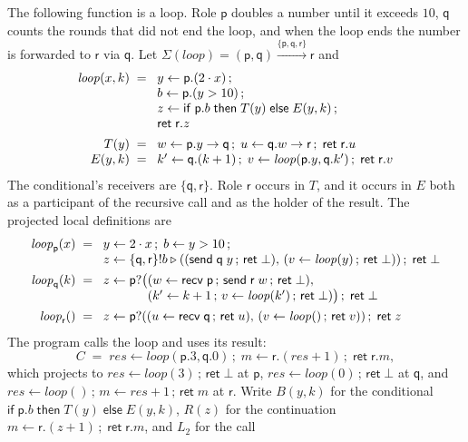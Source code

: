 \documentclass[11pt]{report}
\theoremstyle{plain}
\theoremstyle{definition}
\theoremstyle{remark}
\newcommand{\kw}[1]{\mathsf{#1}}
\newcommand{\pp}{\mathsf{p}}
\newcommand{\qq}{\mathsf{q}}
\newcommand{\rr}{\mathsf{r}}
\newcommand{\bind}[3]{#1 \leftarrow #2\,;\;#3}
\newcommand{\cret}[1]{\kw{ret}\;#1}
\newcommand{\com}[3]{#1.#2 \to #3}
\newcommand{\cif}[4]{\kw{if}\;#1.#2\;\kw{then}\;#3\;\kw{else}\;#4}
\newcommand{\nsend}[2]{\kw{send}\;#1\;#2}
\newcommand{\nrecv}[1]{\kw{recv}\;#1}
\newcommand{\sendbr}[4]{#1!#2 \mathbin{\triangleright} (#3,\,#4)}
\newcommand{\recvbr}[3]{#1?(#2,\,#3)}
\newcommand{\Sig}{\Sigma}
\newcommand{\farr}[3]{(#1) \xrightarrow{#2} #3}
\begin{document}
The following function is a loop.  Role $\pp$ doubles a number until it
exceeds $10$, $\qq$ counts the rounds that did not end the loop, and when the
loop ends the number is forwarded to $\rr$ via $\qq$.  Let
$\Sig(\mathit{loop})=\farr{\pp,\qq}{\{\pp,\qq,\rr\}}{\rr}$ and
\[
\begin{array}{r@{\;\;}l}
  \mathit{loop}(x,k) \;=\; & \bind{y}{\pp.(2\cdot x)}{}\\
    & \bind{b}{\pp.(y>10)}{}\\
    & \bind{z}{\cif{\pp}{b}{T(y)}{E(y,k)}}{}\\
    & \cret{\rr.z}\\[1ex]
  T(y) \;=\; & \bind{w}{\com{\pp}{y}{\qq}}{\bind{u}{\com{\qq}{w}{\rr}}{\cret{\rr.u}}}\\
  E(y,k) \;=\; & \bind{k'}{\qq.(k+1)}{\bind{v}{\mathit{loop}(\pp.y,\qq.k')}{\cret{\rr.v}}}
\end{array}
\]
The conditional's receivers are $\{\qq,\rr\}$.  Role $\rr$ occurs in $T$, and
it occurs in $E$ both as a participant of the recursive call and as the holder
of the result.  The projected local definitions are
\[
\begin{array}{r@{\;\;}l}
  \mathit{loop}_\pp(x) \;=\; & y\leftarrow 2\cdot x\,;\; b\leftarrow y>10\,;\\
     & z\leftarrow\sendbr{\{\qq,\rr\}}{b}{(\nsend{\qq}{y}\,;\,\kw{ret}\;\bot)}{(v\leftarrow\mathit{loop}(y)\,;\,\kw{ret}\;\bot)}\,;\;\kw{ret}\;\bot\\[1ex]
  \mathit{loop}_\qq(k) \;=\; & z\leftarrow\pp?\big((w\leftarrow\nrecv{\pp}\,;\,\nsend{\rr}{w}\,;\,\kw{ret}\;\bot),\\
     & \hphantom{z\leftarrow\pp?\big(}(k'\leftarrow k+1\,;\,v\leftarrow\mathit{loop}(k')\,;\,\kw{ret}\;\bot)\big)\,;\;\kw{ret}\;\bot\\[1ex]
  \mathit{loop}_\rr() \;=\; & z\leftarrow\recvbr{\pp}{(u\leftarrow\nrecv{\qq}\,;\,\kw{ret}\;u)}{(v\leftarrow\mathit{loop}()\,;\,\kw{ret}\;v)}\,;\;\kw{ret}\;z
\end{array}
\]
The program calls the loop and uses its result:
\[
  C \;=\; \bind{\mathit{res}}{\mathit{loop}(\pp.3,\qq.0)}{\bind{m}{\rr.(\mathit{res}+1)}{\cret{\rr.m}}},
\]
which projects to $\mathit{res}\leftarrow\mathit{loop}(3)\,;\,\kw{ret}\;\bot$
at $\pp$, $\mathit{res}\leftarrow\mathit{loop}(0)\,;\,\kw{ret}\;\bot$ at $\qq$,
and $\mathit{res}\leftarrow\mathit{loop}()\,;\,m\leftarrow\mathit{res}+1\,;\,\kw{ret}\;m$
at $\rr$.  Write $B(y,k)$ for the conditional
$\cif{\pp}{b}{T(y)}{E(y,k)}$, $R(z)$ for the continuation
$\bind{m}{\rr.(z+1)}{\cret{\rr.m}}$, and $L_2$ for the call
\end{document}
